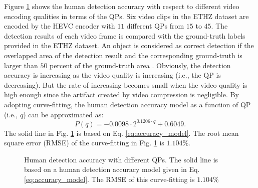 \documentclass[journal]{IEEEtran}
\begin{document}
Figure \ref{fig:accuracy} shows the human detection accuracy with respect to different video encoding qualities in terms of the QPs. Six video clips in the ETHZ dataset \cite{ELSG08} are encoded by the HEVC encoder \cite{X265} with $11$ different QPs from $15$ to $45$. The detection results of each video frame is compared with the ground-truth labels provided in the ETHZ dataset. An object is considered as correct detection if the overlapped area of the detection result and the corresponding ground-truth is larger than $50$ percent of the ground-truth area \cite{FGMR10}. Obviously, the detection accuracy is increasing as the video quality is increasing (i.e., the QP is decreasing). But the rate of increasing becomes small when the video quality is high enough since the artifact created by video compression is negligible. By adopting curve-fitting, the human detection accuracy model as a function of QP (i.e., $q$) can be approximated as:
\begin{equation}\label{eq:accuracy_model}
P\left(q\right) = -0.0098\cdot 2^{0.1206\cdot q}+0.6049.
\end{equation}
The solid line in Fig. \ref{fig:accuracy} is based on Eq. \eqref{eq:accuracy_model}. The root mean square error (RMSE) of the curve-fitting in Fig. \ref{fig:accuracy} is $1.104\%$.


\begin{figure}[t]
\caption{Human detection accuracy with different QPs. The solid line is based on a human detection accuracy model given in Eq. \eqref{eq:accuracy_model}. The RMSE of this curve-fitting is $1.104\%$}\label{fig:accuracy}
\end{figure}
\end{document}

